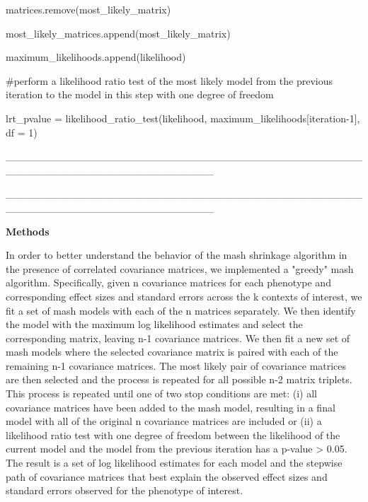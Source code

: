 \documentclass[
  letterpaper,
  DIV=11,
  numbers=noendperiod]{scrartcl}
\begin{document}
matrices.remove(most\_likely\_matrix)

most\_likely\_matrices.append(most\_likely\_matrix)

maximum\_likelihoods.append(likelihood)

\hfill\break

\#perform a likelihood ratio test of the most likely model from the
previous iteration to the model in this step with one degree of freedom

lrt\_pvalue = likelihood\_ratio\_test(likelihood,
maximum\_likelihoods{[}iteration-1{]}, df = 1)

\_\_\_\_\_\_\_\_\_\_\_\_\_\_\_\_\_\_\_\_\_\_\_\_\_\_\_\_\_\_\_\_\_\_\_\_\_\_\_\_\_\_\_\_\_\_\_\_\_\_\_\_\_\_\_\_\_\_\_\_\_\_\_\_\_\_\_\_\_\_\_\_\_\_\_\_

\_\_\_\_\_\_\_\_\_\_\_\_\_\_\_\_\_\_\_\_\_\_\_\_\_\_\_\_\_\_\_\_\_\_\_\_\_\_\_\_\_\_\_\_\_\_\_\_\_\_\_\_\_\_\_\_\_\_\_\_\_\_\_\_\_\_\_\_\_\_\_\_\_\_\_\_

\hfill\break

\textbf{Methods}

In order to better understand the behavior of the mash shrinkage
algorithm in the presence of correlated covariance matrices, we
implemented a "greedy" mash algorithm. Specifically, given n covariance
matrices for each phenotype and corresponding effect sizes and standard
errors across the k contexts of interest, we fit a set of mash models
with each of the n matrices separately. We then identify the model with
the maximum log likelihood estimates and select the corresponding
matrix, leaving n-1 covariance matrices. We then fit a new set of mash
models where the selected covariance matrix is paired with each of the
remaining n-1 covariance matrices. The most likely pair of covariance
matrices are then selected and the process is repeated for all possible
n-2 matrix triplets. This process is repeated until one of two stop
conditions are met: (i) all covariance matrices have been added to the
mash model, resulting in a final model with all of the original n
covariance matrices are included or (ii) a likelihood ratio test with
one degree of freedom between the likelihood of the current model and
the model from the previous iteration has a p-value \textgreater{} 0.05.
The result is a set of log likelihood estimates for each model and the
stepwise \textquotesingle path\textquotesingle{} of covariance matrices
that best explain the observed effect sizes and standard errors observed
for the phenotype of interest.~

\hfill\break
\end{document}

